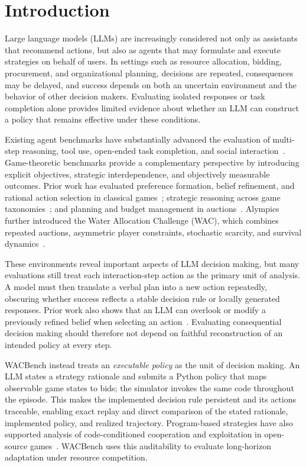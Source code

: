 \documentclass[letterpaper]{article} %
\begin{document}
\section{Introduction}

Large language models (LLMs) are increasingly considered not only as
assistants that recommend actions, but also as agents that may formulate and
execute strategies on behalf of users. In settings such as resource
allocation, bidding, procurement, and organizational planning, decisions are
repeated, consequences may be delayed, and success depends on both an
uncertain environment and the behavior of other decision makers. Evaluating
isolated responses or task completion alone provides limited evidence about
whether an LLM can construct a policy that remains effective under these
conditions.

Existing agent benchmarks have substantially advanced the evaluation of
multi-step reasoning, tool use, open-ended task completion, and social
interaction~\cite{liu2023agentbench,mialon2023gaia,zhou2024sotopia,zhu2025multiagentbench}.
Game-theoretic benchmarks provide a complementary perspective by introducing
explicit objectives, strategic interdependence, and objectively measurable
outcomes. Prior work has evaluated preference formation, belief refinement,
and rational action selection in classical games~\cite{fan2024rational};
strategic reasoning across game taxonomies~\cite{duan2024gtbench,huang2025gamabench};
and planning and budget management in auctions~\cite{chen2023aucarena}.
Alympics further introduced the Water Allocation Challenge (WAC), which
combines repeated auctions, asymmetric player constraints, stochastic
scarcity, and survival dynamics~\cite{mao2025alympics}.

These environments reveal important aspects of LLM decision making, but many
evaluations still treat each interaction-step action as the primary unit of
analysis. A model must then translate a verbal plan into a new action
repeatedly, obscuring whether success reflects a stable decision rule or
locally generated responses. Prior work also shows that an LLM can overlook or
modify a previously refined belief when selecting an
action~\cite{fan2024rational}. Evaluating consequential decision making should
therefore not depend on faithful reconstruction of an intended policy at every
step.

WACBench instead treats an \emph{executable policy} as the unit of decision
making. An LLM states a strategy rationale and submits a Python policy that
maps observable game states to bids; the simulator invokes the same code
throughout the episode. This makes the implemented decision rule persistent
and its actions traceable, enabling exact replay and direct comparison of the
stated rationale, implemented policy, and realized trajectory. Program-based
strategies have also supported analysis of code-conditioned cooperation and
exploitation in open-source games~\cite{sistla2025opensourcegames}. WACBench
uses this auditability to evaluate long-horizon adaptation under resource
competition.
\end{document}
